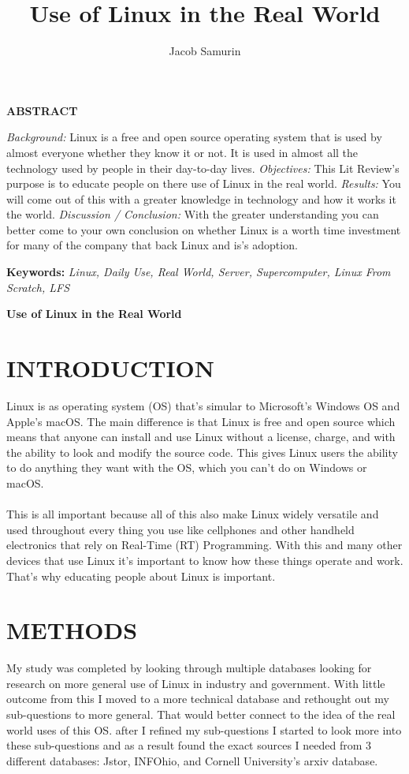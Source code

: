 \documentclass{article}
\title{Use of Linux in the Real World}
\author{Jacob Samurin}
\begin{document}
\maketitle
\thispagestyle{fancy}
\newpage
\begin{center}
	\LARGE\textbf{ABSTRACT}
\end{center}
\begin{singlespace}
	\textit{Background:} Linux is a free and open source operating system that is used by almost everyone whether they know it or not. It is used in almost all the technology used by people in their day-to-day lives. \textit{Objectives:} This Lit Review's purpose is to educate people on there use of Linux in the real world. \textit{Results:} You will come out of this with a greater knowledge in technology and how it works it the world. \textit{Discussion / Conclusion:} With the greater understanding you can better come to your own conclusion on whether Linux is a worth time investment for many of the company that back Linux and is's adoption.\\
\end{singlespace}
\textbf{Keywords:} \textit{Linux, Daily Use, Real World, Server, Supercomputer, Linux From Scratch, LFS}
\newpage
\begin{center}
	\LARGE\textbf{Use of Linux in the Real World}
\end{center}
\section{INTRODUCTION}
Linux is as operating system (OS) that's simular to Microsoft's Windows OS and Apple's macOS.
The main difference is that Linux is free and open source which means that anyone can install and use Linux without a license, charge, and with the ability to look and modify the source code.
This gives Linux users the ability to do anything they want with the OS, which you can't do on Windows or macOS.
\\ \\
This is all important because all of this also make Linux widely versatile and used throughout every thing you use like cellphones and other handheld electronics that rely on Real-Time (RT) Programming.
With this and many other devices that use Linux it's important to know how these things operate and work.
That's why educating people about Linux is important.
\section{METHODS}
My study was completed by looking through multiple databases looking for research on more general use of Linux in industry and government.
With little outcome from this I moved to a more technical database and rethought out my sub-questions to more general.
That would better connect to the idea of the real world uses of this OS.
after I refined my sub-questions I started to look more into these sub-questions and as a result found the exact sources I needed from 3 different databases: Jstor, INFOhio, and Cornell University's arxiv database.
\end{document}
